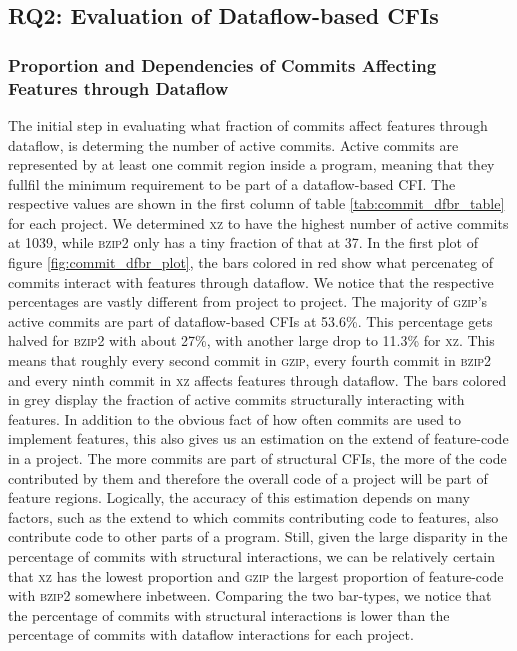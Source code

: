 \subsection*{\textbf{RQ2: Evaluation of Dataflow-based CFIs}}\label{sec:eval_df_cfis}

\subsubsection*{Proportion and Dependencies of Commits Affecting Features through Dataflow}\label{sec:eval_commit_dfbr}

The initial step in evaluating what fraction of commits affect features through dataflow, is determing the number of active commits.
Active commits are represented by at least one commit region inside a program, meaning that they fullfil the minimum requirement to be part of a dataflow-based CFI.
The respective values are shown in the first column of table \ref{tab:commit_dfbr_table} for each project.
We determined \textsc{xz} to have the highest number of active commits at 1039, while \textsc{bzip2} only has a tiny fraction of that at 37.
In the first plot of figure \ref{fig:commit_dfbr_plot}, the bars colored in red show what percenateg of commits interact with features through dataflow.
We notice that the respective percentages are vastly different from project to project.
The majority of \textsc{gzip}'s active commits are part of dataflow-based CFIs at 53.6\%.
This percentage gets halved for \textsc{bzip2} with about 27\%, with another large drop to 11.3\% for \textsc{xz}.
This means that roughly every second commit in \textsc{gzip}, every fourth commit in \textsc{bzip2} and every ninth commit in \textsc{xz} affects features through dataflow.
The bars colored in grey display the fraction of active commits structurally interacting with features.
In addition to the obvious fact of how often commits are used to implement features, this also gives us an estimation on the extend of feature-code in a project.
The more commits are part of structural CFIs, the more of the code contributed by them and therefore the overall code of a project will be part of feature regions.
Logically, the accuracy of this estimation depends on many factors, such as the extend to which commits contributing code to features, also contribute code to other parts of a program.
Still, given the large disparity in the percentage of commits with structural interactions, we can be relatively certain that \textsc{xz} has the lowest proportion and \textsc{gzip} the largest proportion of feature-code with \textsc{bzip2} somewhere inbetween.
Comparing the two bar-types, we notice that the percentage of commits with structural interactions is lower than the percentage of commits with dataflow interactions for each project.

